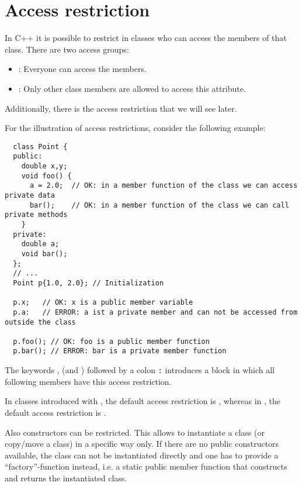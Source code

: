 \section{Access restriction\label{sec:access-restriction}}
In C++ it is possible to restrict in classes who can access the members of that class. There are two access groups:
\begin{itemize}
	\item {}: Everyone can access the members.
	\item {}: Only other class members are allowed to access this attribute.
\end{itemize}
Additionally, there is the access restriction  that we will see later.

\begin{example}
  For the illustration of access restrictions, consider the following example:
  \begin{verbatim}
  class Point {
  public:
    double x,y;
    void foo() {
      a = 2.0;  // OK: in a member function of the class we can access private data
      bar();    // OK: in a member function of the class we can call private methods
    }
  private:
    double a;
    void bar();
  };
  // ...
  Point p{1.0, 2.0}; // Initialization

  p.x;   // OK: x is a public member variable
  p.a:   // ERROR: a ist a private member and can not be accessed from outside the class

  p.foo(); // OK: foo is a public member function
  p.bar(); // ERROR: bar is a private member function
  \end{verbatim}
\end{example}

The keywords ,  (and ) followed by a colon \texttt{:} introduces a block in which all following members
have this access restriction.

\begin{rem}
  In classes introduced with , the default access restriction is , whereas in , the default access restriction is
  .
\end{rem}

\begin{rem}
  Also constructors can be restricted. This allows to instantiate a class (or copy/move a class) in a specific way only. If there are no public
  constructors available, the class can not be instantiated directly and one has to provide a ``factory''-function instead, i.e. a static public
  member function that constructs and returns the instantiated class.
\end{rem}


